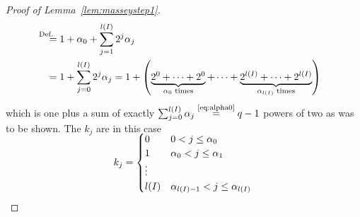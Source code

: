 \begin{proof}[Proof of Lemma~\ref{lem:masseystep1}]
\begin{align*}
    &\equalsby{Def.}
      1 + \alpha_0 + \sum_{j=1}^{\l(I)}2^j\alpha_j \\
    &= 1 + \sum_{j=0}^{\l(I)}2^j\alpha_j
    = 1 + \left(
      \underbrace{2^0 +\dotsb+ 2^0}_{\text{$\alpha_0$ times}}
      + \dotsb
      + \underbrace{2^{\l(I)}+\dotsb+2^{\l(I)}}_{\text{$\alpha_{\l(I)}$ times}}
      \right)
  \end{align*}
  which is one plus a sum of exactly
  $\sum_{j=0}^{l(I)}\alpha_j\overset{\text{\eqref{eq:alpha0}}}= q-1$
  powers of two as was to be shown.
  The $k_j$ are in this case
  \begin{gather*}
    \SwapAboveDisplaySkip
    k_j = \begin{cases}
      0 & 0< j\leq \alpha_0\\
      1 & \alpha_0< j\leq \alpha_1\\
      \vdots\\
      \l(I) & \alpha_{\l(I)-1}<j\leq \alpha_{\l(I)}
    \end{cases}
    \qedhere
  \end{gather*}
\end{proof}

